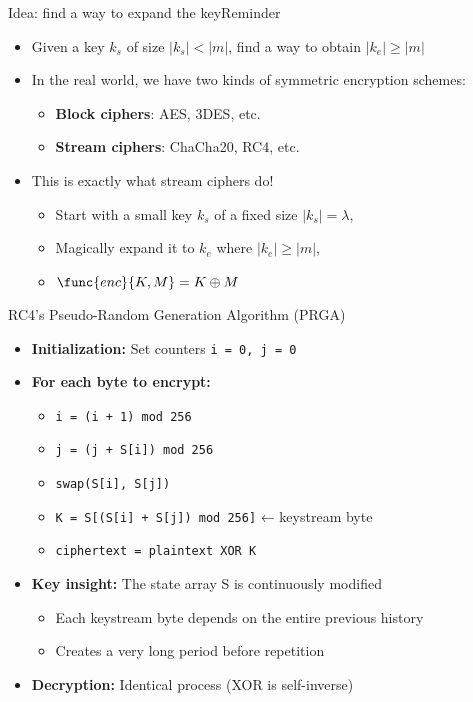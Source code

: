 \documentclass[aspectratio=169, lualatex, handout]{beamer}
\begin{document}
\begin{frame}{Idea: find a way to expand the key}{Reminder}
	\begin{itemize}[<+->]
		\item Given a key $k_s$ of size $\left|k_s\right| < \left|m\right|$, find a way to obtain $\left|k_e\right| \geq \left|m\right|$
		\item In the real world, we have two kinds of symmetric encryption schemes:
		      \begin{itemize}[<+->]
			      \item \textbf{Block ciphers}: AES, 3DES, etc.
			      \item \textbf{Stream ciphers}: ChaCha20, RC4, etc.
		      \end{itemize}
		\item This is exactly what stream ciphers do!
		      \begin{itemize}[<+->]
			      \item Start with a small key $k_s$ of a fixed size $\left|k_s\right| = \lambda$,
			      \item Magically expand it to $k_e$ where $\left|k_e\right| \geq \left|m\right|$,
			      \item $\func{enc}{K, M} = K \oplus M$
		      \end{itemize}
	\end{itemize}
\end{frame}

\begin{frame}{RC4's Pseudo-Random Generation Algorithm (PRGA)}
	\begin{itemize}[<+->]
		\item \textbf{Initialization:} Set counters \texttt{i = 0, j = 0}
		\item \textbf{For each byte to encrypt:}
		      \begin{itemize}[<+->]
			      \item \texttt{i = (i + 1) mod 256}
			      \item \texttt{j = (j + S[i]) mod 256}
			      \item \texttt{swap(S[i], S[j])}
			      \item \texttt{K = S[(S[i] + S[j]) mod 256]} \quad ← keystream byte
			      \item \texttt{ciphertext = plaintext XOR K}
		      \end{itemize}
		\item \textbf{Key insight:} The state array S is continuously modified
		      \begin{itemize}[<+->]
			      \item Each keystream byte depends on the entire previous history
			      \item Creates a very long period before repetition
		      \end{itemize}
		\item \textbf{Decryption:} Identical process (XOR is self-inverse)
	\end{itemize}
\end{frame}
\end{document}
